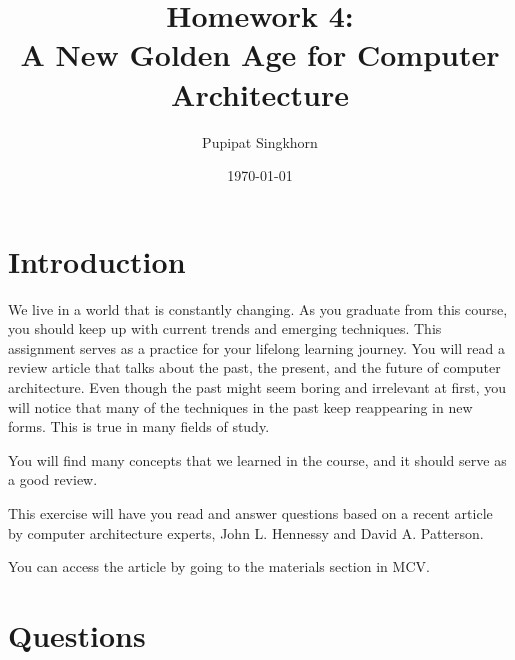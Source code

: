 \documentclass[a4paper,12pt]{article}
\title{Homework 4:\\A New Golden Age for Computer Architecture}
\author{Pupipat Singkhorn}
\date{\today}
\begin{document}
\maketitle

\section*{Introduction}

We live in a world that is constantly changing. As you graduate from this course, you should keep up with current trends and emerging techniques. This assignment serves as a practice for your lifelong learning journey. You will read a review article that talks about the past, the present, and the future of computer architecture. Even though the past might seem boring and irrelevant at first, you will notice that many of the techniques in the past keep reappearing in new forms. This is true in many fields of study.

You will find many concepts that we learned in the course, and it should serve as a good review.

This exercise will have you read and answer questions based on a recent article by computer architecture experts, John L. Hennessy and David A. Patterson.

You can access the article by going to the materials section in MCV.

\section*{Questions}
\end{document}
